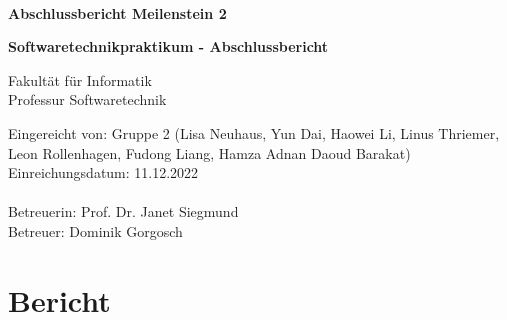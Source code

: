 \documentclass[a4paper, 12pt, oneside, BCOR1cm,toc=chapterentrywithdots]{scrbook}
\begin{document}
\begin{titlepage}

{
    \begin{center}
        \\
    \end{center}
    \vspace{0.5cm}
}

\begin{center}

\LARGE{\textbf{Abschlussbericht Meilenstein 2}}\\
\vspace{1cm}


\Large{\textbf{Softwaretechnikpraktikum - Abschlussbericht}}\\ 
\vspace{1cm}

Fakultät für Informatik\\
Professur Softwaretechnik
\end{center}
\vspace{3cm}
Eingereicht von: Gruppe 2 (Lisa Neuhaus, Yun Dai, Haowei Li, Linus Thriemer, Leon Rollenhagen, Fudong Liang, Hamza Adnan Daoud Barakat)\\
Einreichungsdatum: 11.12.2022\\
\vspace{0.3cm}\\
Betreuerin: Prof. Dr. Janet Siegmund \\
Betreuer: Dominik Gorgosch

\end{titlepage}

\chapter{Bericht}
\end{document}
